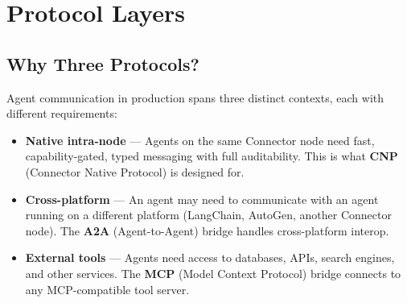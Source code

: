 \chapter{Protocol Layers}

\section{Why Three Protocols?}

Agent communication in production spans three distinct contexts, each with
different requirements:

\begin{itemize}[leftmargin=1.5em]
  \item \textbf{Native intra-node} — Agents on the same Connector node need
        fast, capability-gated, typed messaging with full auditability.
        This is what \textbf{CNP} (Connector Native Protocol) is designed for.

  \item \textbf{Cross-platform} — An agent may need to communicate with an agent
        running on a different platform (LangChain, AutoGen, another Connector node).
        The \textbf{A2A} (Agent-to-Agent) bridge handles cross-platform interop.

  \item \textbf{External tools} — Agents need access to databases, APIs, search
        engines, and other services. The \textbf{MCP} (Model Context Protocol)
        bridge connects to any MCP-compatible tool server.
\end{itemize}

